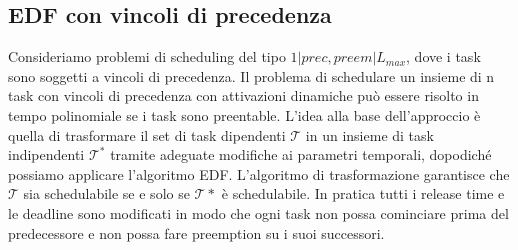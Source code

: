 \documentclass[12pt]{article}
\begin{document}
\subsection{EDF con vincoli di precedenza}
Consideriamo problemi di scheduling del tipo $1|prec,preem|L_{max}$, dove i task sono soggetti a vincoli di precedenza.
Il problema di schedulare un insieme di n task con vincoli di precedenza con attivazioni dinamiche può essere risolto in tempo polinomiale  se i task sono preentable.
L'idea alla base dell'approccio è quella di trasformare  il set di task dipendenti $\mathcal{T}$ in un insieme di task indipendenti $\mathcal{T}^*$ tramite adeguate modifiche ai parametri temporali, dopodiché possiamo applicare l'algoritmo EDF.
L'algoritmo di trasformazione garantisce che $\mathcal{T}$ sia schedulabile se e solo se $\mathcal{T}*$ è schedulabile. In pratica tutti i release time e le deadline sono modificati in modo che ogni task non possa cominciare prima del predecessore e non possa fare preemption su i suoi successori.
\end{document}

